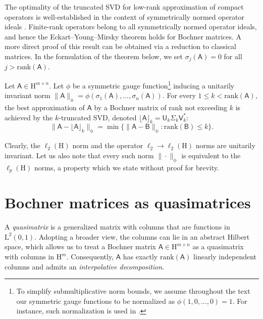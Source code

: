 \documentclass[onefignum,onetabnum]{siamart250211}
\renewenvironment{equation*}{\[}{\]\ignorespacesafterend}
\newcommand{\Hilb}{\mathrm{H}}
\newcommand{\Ell}{\mathrm{L}}
\newcommand{\set}[3][]{#1\{ #2 : #3 #1\}}
\newcommand{\Batrix}[1]{\bm{\Matrix{#1}}}
\newcommand{\Matrix}[1]{\mathsf{#1}}
\newcommand{\rank}[2][]{\mathrm{rank} #1( #2 #1)}
\newcommand{\truncate}[3][]{#1\lfloor #2 #1\rfloor_{#3}}
\newcommand{\Norm}[3][]{#1\| #2 #1\|_{\mathrm{#3}}}
\begin{document}
The optimality of the truncated SVD for low-rank approximation of compact operators is well-established in the context of symmetrically normed operator ideals \cite[Ch.~3, Lem.~6.1]{gohberg1969introduction}. 
Finite-rank operators belong to all symmetrically normed operator ideals, and hence the Eckart--Young--Mirsky theorem holds for Bochner matrices.
A more direct proof of this result can be obtained via a reduction to classical matrices.
In the formulation of the theorem below, we set $\sigma_j(\Batrix{A}) = 0$ for all $j > \rank{\Batrix{A}}$.

\begin{theorem}
\label{theorem:mirsky}
Let $\Batrix{A} \in \Hilb^{m \times n}$.
Let $\phi$ be a symmetric gauge function\footnote{To simplify submultiplicative norm bounds, we assume throughout the text our symmetric gauge functions to be normalized as $\phi(1, 0, \ldots, 0) = 1$. For instance, such normalization is used in \cite{gohberg1969introduction}.} inducing a unitarily invariant norm $\Norm{\Batrix{A}}{\phi} = \phi(\sigma_1(\Batrix{A}), \ldots, \sigma_n(\Batrix{A}))$.
For every $1 \leq k < \rank{\Batrix{A}}$, the best approximation of $\Batrix{A}$ by a Bochner matrix of rank not exceeding $k$ is achieved by the $k$-truncated SVD, denoted $\truncate{\Batrix{A}}{k} = \Batrix{U}_k \Matrix{\Sigma}_k \Matrix{V}_k^\ast$:
\begin{equation*}
    \Norm{\Batrix{A} - \truncate{\Batrix{A}}{k}}{\phi} = \min \set{\Norm{\Batrix{A} - \Batrix{B}}{\phi}}{\rank{\Batrix{B}} \leq k}.
\end{equation*}
\end{theorem}

Clearly, the $\ell_2(\Hilb)$ norm and the operator $\ell_2 \to \ell_2(\Hilb)$ norms are unitarily invariant.
Let us also note that every such norm $\Norm{\cdot}{\phi}$ is equivalent to the $\ell_p(\Hilb)$ norms, a property which we state without proof for brevity.
\section{Bochner matrices as quasimatrices}
\label{sec:bmx_qm}
A \emph{quasimatrix} \cite{trefethen2010householder, townsend2015continuous, shustin2022semi} is a generalized matrix with columns that are functions in $\Ell^2(0,1)$.
Adopting a broader view, the columns can lie in an abstract Hilbert space, which allows us to treat a Bochner matrix $\Batrix{A} \in \Hilb^{m \times n}$ as a quasimatrix with columns in $\Hilb^{m}$.
Consequently, $\Batrix{A}$ has exactly $\rank{\Batrix{A}}$ linearly independent columns and admits an \emph{interpolative decomposition}.
\end{document}
